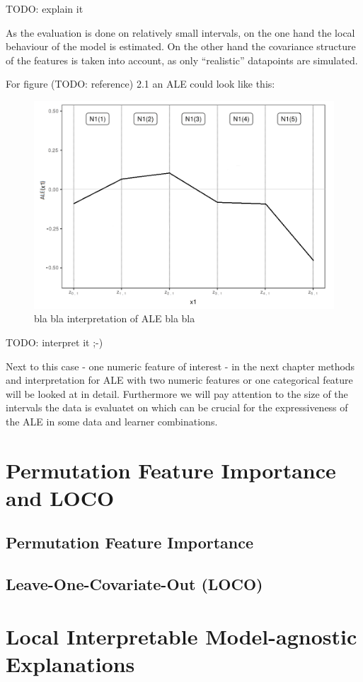 \documentclass[]{krantz}
\begin{document}
TODO: explain it

As the evaluation is done on relatively small intervals, on the one hand
the local behaviour of the model is estimated. On the other hand the
covariance structure of the features is taken into account, as only
``realistic'' datapoints are simulated.

For figure (TODO: reference) 2.1 an ALE could look like this:

\begin{figure}
\includegraphics[width=13.75in]{images/ale_example} \caption{bla bla interpretation of ALE bla bla}\label{fig:unnamed-chunk-2}
\end{figure}



TODO: interpret it ;-)

Next to this case - one numeric feature of interest - in the next
chapter methods and interpretation for ALE with two numeric features or
one categorical feature will be looked at in detail. Furthermore we will
pay attention to the size of the intervals the data is evaluatet on
which can be crucial for the expressiveness of the ALE in some data and
learner combinations.

\chapter{Permutation Feature Importance and
LOCO}\label{permutation-feature-importance-and-loco}

\section{Permutation Feature
Importance}\label{permutation-feature-importance}

\section{Leave-One-Covariate-Out
(LOCO)}\label{leave-one-covariate-out-loco}

\chapter{Local Interpretable Model-agnostic
Explanations}\label{local-interpretable-model-agnostic-explanations}



\backmatter
\printindex
\end{document}
